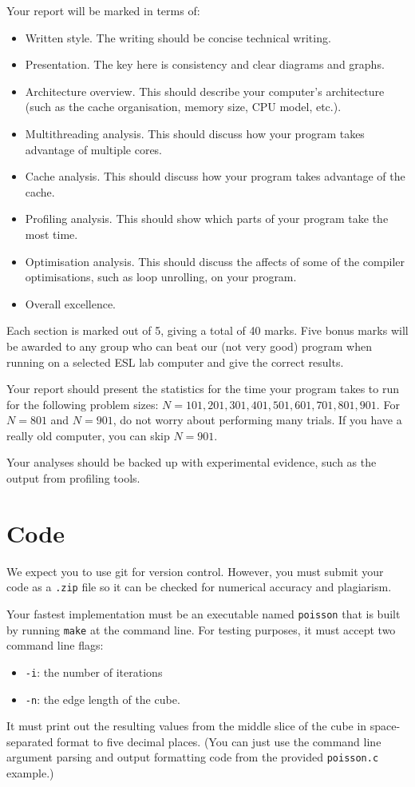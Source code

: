 \documentclass[a4paper,11pt]{article}
\newcommand{\code}[1]{\texttt{#1}}
\begin{document}
Your report will be marked in terms of:
%
\begin{itemize}
\item Written style.  The writing should be concise technical writing.
\item Presentation.  The key here is consistency and clear diagrams
  and graphs.
\item Architecture overview.  This should describe your computer's
  architecture (such as the cache organisation, memory size, CPU model,
  etc.).
\item Multithreading analysis.  This should discuss how your program
  takes advantage of multiple cores.
\item Cache analysis.  This should discuss how your program takes
  advantage of the cache.
\item Profiling analysis.  This should show which parts of your
  program take the most time.
\item Optimisation analysis.  This should discuss the affects of some
  of the compiler optimisations, such as loop unrolling, on your
  program.
\item Overall excellence.
\end{itemize}
%
Each section is marked out of 5, giving a total of 40 marks.  Five
bonus marks will be awarded to any group who can beat our (not very
good) program when running on a selected ESL lab computer and give the
correct results.

Your report should present the statistics for the time your program
takes to run for the following problem sizes: $N=101, 201, 301, 401,
501, 601, 701, 801, 901$.  For $N=801$ and $N=901$, do not worry about
performing many trials.  If you have a really old computer, you can
skip $N=901$.

Your analyses should be backed up with experimental evidence, such as
the output from profiling tools.




\section{Code}

We expect you to use git for version control.  However, you must
submit your code as a \code{.zip} file so it can be checked for
numerical accuracy and plagiarism.

Your fastest implementation must be an executable named \code{poisson}
that is built by running \code{make} at the command line.  For testing
purposes, it must accept two command line flags:
\begin{itemize}
  \item \code{-i}: the number of iterations
  \item \code{-n}: the edge length of the cube.
\end{itemize}
It must print out the resulting values from the middle slice of the
cube in space-separated format to five decimal places.  (You can just
use the command line argument parsing and output formatting code from
the provided \code{poisson.c} example.)
\end{document}
